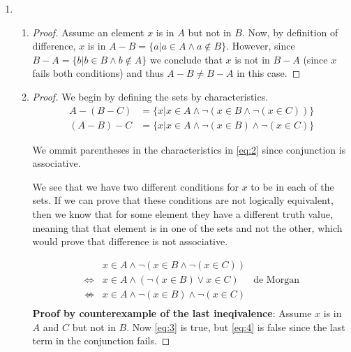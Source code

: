 \documentclass{article}
\begin{document}
\begin{enumerate}
    \item
        \begin{enumerate}
            \item
                \begin{proof}
                    Assume an element $x$ is in $A$ but not in $B$. Now, by definition of difference, $x$ is in  $A - B = \{a | a \in A \land a \not\in B\}$. However, since $B - A = \{b | b \in B \land b \not\in A\}$ we conclude that $x$ is not in $B - A$ (since $x$ fails both conditions) and thus $A - B \not= B - A$ in this case.
                \end{proof}

            \item
                \begin{proof}
                    We begin by defining the sets by characteristics.
                    \begin{align}
                        A - (B - C) &= \{x | x \in A \land \lnot(x \in B  \land \lnot(x \in C))\} \label{eq:1} \\
                        (A - B) - C &= \{x | x \in A \land \lnot(x \in B) \land \lnot(x \in C)\} \label{eq:2}
                    \end{align}

                    We ommit parentheses in the characteristics in \ref{eq:2} since conjunction is associative.

                    We see that we have two different conditions for $x$ to be in each of the sets. If we can prove that these conditions are not logically equivalent, then we know that for some element they have a different truth value, meaning that that element is in one of the sets and not the other, which would prove that difference is not associative.

                    \begin{align}
                        &x \in A \land \lnot(x \in B  \land \lnot(x \in C)) &\\
                        \label{eq:3}\Leftrightarrow &x \in A \land (\lnot(x \in B) \lor x \in C) & \text{de Morgan}\\
                        \label{eq:4}\not\Leftrightarrow & x \in A \land \lnot(x \in B) \land \lnot(x \in C) & \\
                    \end{align}
                    \textbf{Proof by counterexample of the last ineqivalence}: Assume $x$ is in $A$ and $C$ but not in $B$. Now \ref{eq:3} is true, but \ref{eq:4} is false since the last term in the conjunction fails.
                \end{proof}
        \end{enumerate}


\end{enumerate}
\end{document}
